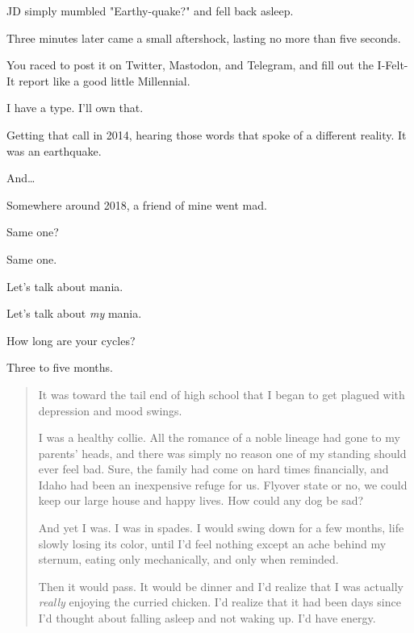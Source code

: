 \begin{paracol}{2}
\begin{leftcolumn}
JD simply mumbled "Earthy-quake?" and fell back asleep.

Three minutes later came a small aftershock, lasting no more than five seconds.

\begin{ally}
You raced to post it on Twitter, Mastodon, and Telegram, and fill out the I-Felt-It report like a good little Millennial.
\end{ally}
I have a type. I'll own that.

Getting that call in 2014, hearing those words that spoke of a different reality. It was an earthquake.

And\ldots{}

\newpage

\noindent Somewhere around 2018, a friend of mine went mad.

\begin{ally}
Same one?
\end{ally}
Same one.

\begin{ally}
Let's talk about mania.
\end{ally}
Let's talk about \emph{my} mania.

\begin{ally}
How long are your cycles?
\end{ally}
Three to five months.

\begin{quotation}
    \noindent It was toward the tail end of high school that I began to get plagued with depression and mood swings.

I was a healthy collie. All the romance of a noble lineage had gone to my parents' heads, and there was simply no reason one of my standing should ever feel bad. Sure, the family had come on hard times financially, and Idaho had been an inexpensive refuge for us. Flyover state or no, we could keep our large house and happy lives. How could any dog be sad?

And yet I was. I was in spades. I would swing down for a few months, life slowly losing its color, until I'd feel nothing except an ache behind my sternum, eating only mechanically, and only when reminded.

Then it would pass. It would be dinner and I'd realize that I was actually \emph{really} enjoying the curried chicken. I'd realize that it had been days since I'd thought about falling asleep and not waking up. I'd have energy.


\end{quotation}
\end{leftcolumn}
\end{paracol}
